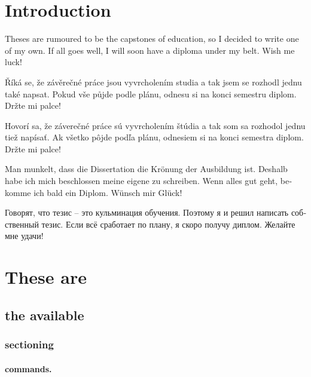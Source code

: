 \documentclass[
  digital, %
  table,   %
  lof,     %
  lot,     %
]{fithesis3}
\def\textrussian#1{{\usefont{T2A}{PTSerif-TLF}{m}{rm}#1}}
\begin{document}
\chapter*{Introduction}

Theses are rumoured to be the capstones of education, so I decided
to write one of my own. If all goes well, I will soon have a
diploma under my belt. Wish me luck!

\begin{otherlanguage}{czech}
Říká se, že závěrečné práce jsou vyvrcholením studia a tak jsem se
rozhodl jednu také napsat. Pokud vše půjde podle plánu, odnesu si
na konci semestru diplom. Držte mi palce!
\end{otherlanguage}

\begin{otherlanguage}{slovak}
Hovorí sa, že záverečné práce sú vyvrcholením štúdia a tak som sa
rozhodol jednu tiež napísať. Ak všetko pôjde podľa plánu, odnesiem
si na konci semestra diplom. Držte mi palce!
\end{otherlanguage}

\begin{otherlanguage}{german}
Man munkelt, dass die Dissertation die Krönung der Ausbildung ist.
Deshalb habe ich mich beschlossen meine eigene zu schreiben. Wenn
alles gut geht, bekomme ich bald ein Diplom. Wünsch mir Glück!
\end{otherlanguage}

\begin{otherlanguage}{russian}\textrussian{%
Говорят, что тезис -- это кульминация обучения. Поэтому я и решил
написать собственный тезис. Если всё сработает по плану, я скоро
получу диплом. Желайте мне удачи!
}\end{otherlanguage}

\chapter{These are}
\section{the available}
\subsection{sectioning}
\subsubsection{commands.}
\end{document}
